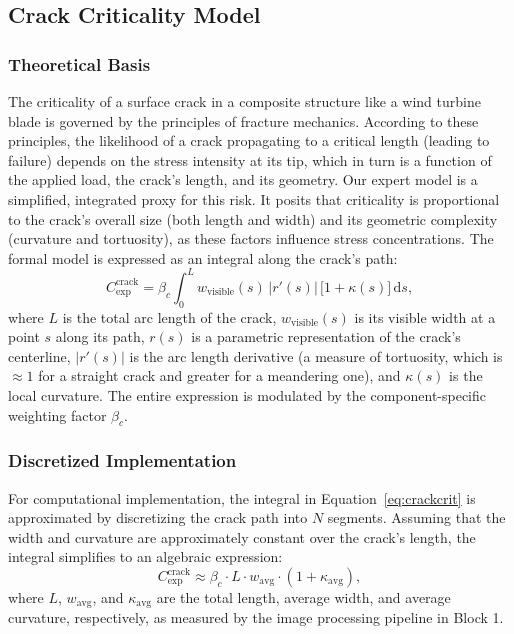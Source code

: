 \documentclass[energies,supfile,submit,pdftex,moreauthors]{Definitions/mdpi}
\begin{document}
\subsection{Crack Criticality Model}
\subsubsection{Theoretical Basis}
The criticality of a surface crack in a composite structure like a wind turbine blade is governed by the principles of fracture mechanics. According to these principles, the likelihood of a crack propagating to a critical length (leading to failure) depends on the stress intensity at its tip, which in turn is a function of the applied load, the crack's length, and its geometry. Our expert model is a simplified, integrated proxy for this risk. It posits that criticality is proportional to the crack's overall size (both length and width) and its geometric complexity (curvature and tortuosity), as these factors influence stress concentrations. The formal model is expressed as an integral along the crack's path:
\begin{equation}
 C_{\text{exp}}^{\text{crack}} = \beta_c \int_0^{L} w_{\text{visible}}(s)\,\bigl|r'(s)\bigr|\,\bigl[1+\kappa(s)\bigr]\,\mathrm{d}s,
 \label{eq:crackcrit}
\end{equation}
where \(L\) is the total arc length of the crack, \(w_{\text{visible}}(s)\) is its visible width at a point \(s\) along its path, \(r(s)\) is a parametric representation of the crack's centerline, \(|r'(s)|\) is the arc length derivative (a measure of tortuosity, which is \(\approx 1\) for a straight crack and greater for a meandering one), and \(\kappa(s)\) is the local curvature. The entire expression is modulated by the component-specific weighting factor \(\beta_c\).

\subsubsection{Discretized Implementation}
For computational implementation, the integral in Equation~\ref{eq:crackcrit} is approximated by discretizing the crack path into \(N\) segments. Assuming that the width and curvature are approximately constant over the crack's length, the integral simplifies to an algebraic expression:
\begin{equation}
 C_{\text{exp}}^{\text{crack}} \approx \beta_c \cdot L \cdot w_{\text{avg}} \cdot (1 + \kappa_{\text{avg}}),
\end{equation}
where \(L\), \(w_{\text{avg}}\), and \(\kappa_{\text{avg}}\) are the total length, average width, and average curvature, respectively, as measured by the image processing pipeline in Block 1.
\end{document}
